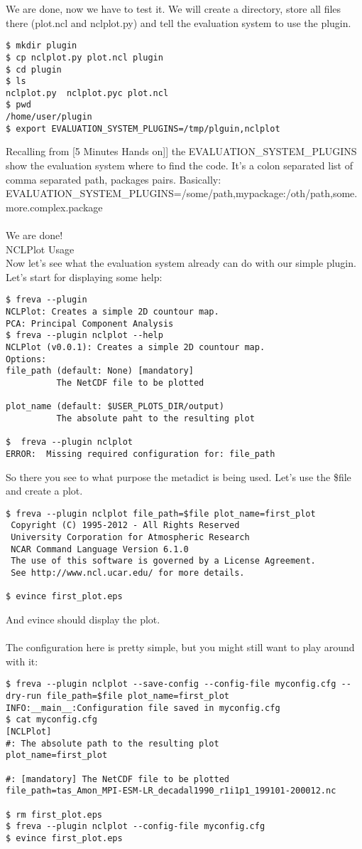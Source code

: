 \documentclass[a4paper,11pt]{ltxdoc}
\begin{document}
We are done, now we have to test it. We will create a directory, store all files there (plot.ncl and nclplot.py) and tell the evaluation system to use the plugin.
\begin{verbatim}
$ mkdir plugin
$ cp nclplot.py plot.ncl plugin
$ cd plugin
$ ls
nclplot.py  nclplot.pyc plot.ncl
$ pwd
/home/user/plugin
$ export EVALUATION_SYSTEM_PLUGINS=/tmp/plguin,nclplot
\end{verbatim}
Recalling from [5 Minutes Hands on]] the EVALUATION\_SYSTEM\_PLUGINS show the evaluation system where to find the code. It's a colon separated list of comma separated path, packages pairs. Basically: EVALUATION\_SYSTEM\_PLUGINS=/some/path,mypackage:/oth/path,some.more.complex.package \\
\\
We are done!
\\
NCLPlot Usage
\\
Now let's see what the evaluation system already can do with our simple plugin. \\
Let's start for displaying some help:
\begin{verbatim}
$ freva --plugin
NCLPlot: Creates a simple 2D countour map.
PCA: Principal Component Analysis
$ freva --plugin nclplot --help
NCLPlot (v0.0.1): Creates a simple 2D countour map.
Options:
file_path (default: None) [mandatory]
          The NetCDF file to be plotted

plot_name (default: $USER_PLOTS_DIR/output)
          The absolute paht to the resulting plot

$  freva --plugin nclplot
ERROR:  Missing required configuration for: file_path
\end{verbatim}
So there you see to what purpose the metadict is being used. Let's use the \$file and create a plot.
\begin{verbatim}
$ freva --plugin nclplot file_path=$file plot_name=first_plot
 Copyright (C) 1995-2012 - All Rights Reserved
 University Corporation for Atmospheric Research
 NCAR Command Language Version 6.1.0
 The use of this software is governed by a License Agreement.
 See http://www.ncl.ucar.edu/ for more details.

$ evince first_plot.eps
\end{verbatim}
And evince should display the plot. \\
\\
The configuration here is pretty simple, but you might still want to play around with it:
\begin{verbatim}
$ freva --plugin nclplot --save-config --config-file myconfig.cfg --dry-run file_path=$file plot_name=first_plot
INFO:__main__:Configuration file saved in myconfig.cfg
$ cat myconfig.cfg 
[NCLPlot]
#: The absolute path to the resulting plot
plot_name=first_plot

#: [mandatory] The NetCDF file to be plotted
file_path=tas_Amon_MPI-ESM-LR_decadal1990_r1i1p1_199101-200012.nc

$ rm first_plot.eps
$ freva --plugin nclplot --config-file myconfig.cfg
$ evince first_plot.eps
\end{verbatim}
\end{document}
